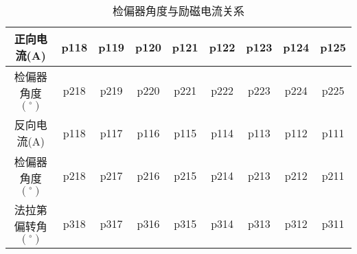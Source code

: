 \newpage
\begin{table}[H]
    \centering
    \begin{tabular}{|c|c|c|c|c|c|c|c|c|}
        \hline
        正向电流(A)              & p118 & p119 & p120 & p121 & p122 & p123 & p124 & p125 \\\hline
        检偏器角度$({}^{\circ})$  & p218 & p219 & p220 & p221 & p222 & p223 & p224 & p225 \\\hline
        反向电流(A)              & p118 & p117 & p116 & p115 & p114 & p113 & p112 & p111 \\\hline
        检偏器角度$({}^{\circ})$  & p218 & p217 & p216 & p215 & p214 & p213 & p212 & p211 \\\hline
        法拉第偏转角$({}^{\circ})$ & p318 & p317 & p316 & p315 & p314 & p313 & p312 & p311 \\\hline
    \end{tabular}
    \caption{检偏器角度与励磁电流关系}
\end{table}
